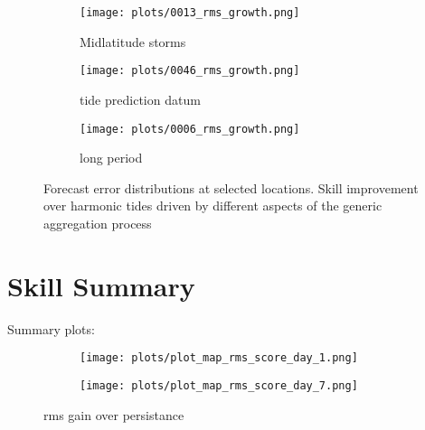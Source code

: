 \begin{figure}[H]
\centering
    \begin{subfigure}[b]{0.3\textwidth}
        \texttt{[image: plots/0013\_rms\_growth.png]}
        \caption{Midlatitude storms}
    \end{subfigure}
    \begin{subfigure}[b]{0.3\textwidth}
        \texttt{[image: plots/0046\_rms\_growth.png]}
        \caption{tide prediction datum}
    \end{subfigure}
        \begin{subfigure}[b]{0.3\textwidth}
        \texttt{[image: plots/0006\_rms\_growth.png]}
        \caption{long period}
    \end{subfigure}
\caption{ Forecast error distributions at selected locations. Skill improvement over harmonic tides driven by different aspects of the generic aggregation process}
\label{fig:rms_c}
\end{figure}   



\section{Skill Summary}


Summary plots:


\begin{figure}[H]
\centering
    \begin{subfigure}[b]{0.45\textwidth}
        \texttt{[image: plots/plot\_map\_rms\_score\_day\_1.png]}
    \end{subfigure}
    \begin{subfigure}[b]{0.45\textwidth}
        \texttt{[image: plots/plot\_map\_rms\_score\_day\_7.png]}
    \end{subfigure}
    \label{fig:rmsgain_b}
    \caption{ rms gain over persistance}
\end{figure}   


